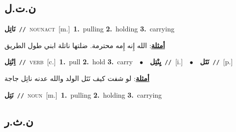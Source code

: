 \documentclass[10pt,a4paper,twoside]{article} %
\begin{document}
\begin{multicols}{2}
{{{{{{{{{{{{{{{\vspace{-3mm}
\subsection*{\color{blue}\foreignlanguage{arabic}{ن.ت.ل}\color{blue}{}} 

{\setlength\topsep{0pt}\textbf{\foreignlanguage{arabic}{نَاتِل}}\ {\color{gray}\texttt{//}\color{black}}\ \textsc{noun\textunderscore act}\ [m.]\ \textbf{1.}~pulling  \textbf{2.}~holding  \textbf{3.}~carrying\  \begin{flushright}\color{gray}\foreignlanguage{arabic}{\textbf{\underline{\foreignlanguage{arabic}{أمثلة}}}: الله إِنه إِمه محترمة. ضلتها ناتلة ابني طول الطريق}\end{flushright}\color{black}} \vspace{2mm}

{\setlength\topsep{0pt}\textbf{\foreignlanguage{arabic}{اِنْتِل}}\ {\color{gray}\texttt{//}\color{black}}\ \textsc{verb}\ [c.]\ \textbf{1.}~pull  \textbf{2.}~hold  \textbf{3.}~carry\ \ $\bullet$\ \ \setlength\topsep{0pt}\textbf{\foreignlanguage{arabic}{يِنْتِل}}\ {\color{gray}\texttt{//}\color{black}}\ [i.]\ \ $\bullet$\ \ \setlength\topsep{0pt}\textbf{\foreignlanguage{arabic}{نَتَل}}\ {\color{gray}\texttt{//}\color{black}}\ [p.]\  \begin{flushright}\color{gray}\foreignlanguage{arabic}{\textbf{\underline{\foreignlanguage{arabic}{أمثلة}}}: لو شفت كيف نَتَل الولد والله عدنه ناتِل جاجة}\end{flushright}\color{black}} \vspace{2mm}

{\setlength\topsep{0pt}\textbf{\foreignlanguage{arabic}{نَتِل}}\ {\color{gray}\texttt{//}\color{black}}\ \textsc{noun}\ [m.]\ \textbf{1.}~pulling  \textbf{2.}~holding  \textbf{3.}~carrying\ 

\vspace{-3mm}
\subsection*{\color{blue}\foreignlanguage{arabic}{ن.ث.ر}\color{blue}{}} 

}}}}}}}}}}}}}}}}
\end{multicols}
\end{document}
